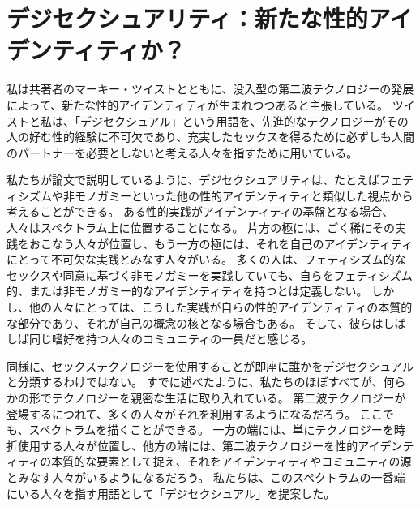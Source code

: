 \documentclass[paper=a4,book,openany]{jlreq}
\begin{document}
\section{デジセクシュアリティ：新たな性的アイデンティティか？}

私は共著者のマーキー・ツイストとともに、没入型の第二波テクノロジーの発展によって、新たな性的アイデンティティが生まれつつあると主張している。
ツイストと私は、「デジセクシュアル」という用語を、先進的なテクノロジーがその人の好む性的経験に不可欠であり、充実したセックスを得るために必ずしも人間のパートナーを必要としないと考える人々を指すために用いている\citep[pp.4--6]{mcarthur17:_rise_digis}。

私たちが論文で説明しているように、デジセクシュアリティは、たとえばフェティシズムや非モノガミーといった他の性的アイデンティティと類似した視点から考えることができる。
ある性的実践がアイデンティティの基盤となる場合、人々はスペクトラム上に位置することになる。
片方の極には、ごく稀にその実践をおこなう人々が位置し、もう一方の極には、それを自己のアイデンティティにとって不可欠な実践とみなす人々がいる。
多くの人は、フェティシズム的なセックスや同意に基づく非モノガミーを実践していても、自らをフェティシズム的、または非モノガミー的なアイデンティティを持つとは定義しない。
しかし、他の人々にとっては、こうした実践が自らの性的アイデンティティの本質的な部分であり、それが自己の概念の核となる場合もある。
そして、彼らはしばしば同じ嗜好を持つ人々のコミュニティの一員だと感じる。

同様に、セックステクノロジーを使用することが即座に誰かをデジセクシュアルと分類するわけではない。
すでに述べたように、私たちのほぼすべてが、何らかの形でテクノロジーを親密な生活に取り入れている。
第二波テクノロジーが登場するにつれて、多くの人々がそれを利用するようになるだろう。
ここでも、スペクトラムを描くことができる。
一方の端には、単にテクノロジーを時折使用する人々が位置し、他方の端には、第二波テクノロジーを性的アイデンティティの本質的な要素として捉え、それをアイデンティティやコミュニティの源とみなす人々がいるようになるだろう。
私たちは、このスペクトラムの一番端にいる人々を指す用語として「デジセクシュアル」を提案した。
\end{document}

